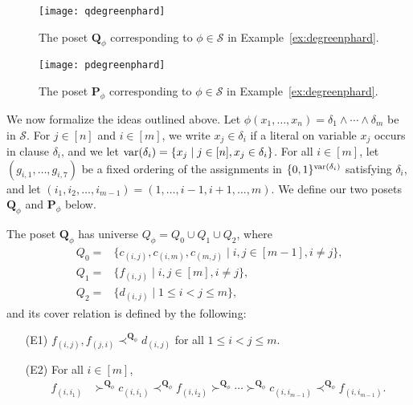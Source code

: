 \documentclass[usletter]{article}
\newcommand{\longversion}[1]{#1}
\newcommand{\shortversion}[1]{}
\newcommand{\longshort}[2]{\longversion{#1}\shortversion{#2}}
\newcommand{\pp}{\mathbf{P}}
\newcommand{\qq}{\mathbf{Q}}
\begin{document}
\newcommand{\figqdegreenphard}[0]{
\begin{figure}[h]
\centering
\texttt{[image: qdegreenphard]}
\caption{The poset $\qq_{\phi}$ corresponding to $\phi \in \mathcal{S}$ in Example~\ref{ex:degreenphard}.}
\label{fig:qdegreenphard}
\end{figure}}

\longversion{\figqdegreenphard}

\newcommand{\figpdegreenphard}[0]{
\begin{figure}[h]
\centering
\texttt{[image: pdegreenphard]}
\caption{The poset $\pp_{\phi}$ corresponding to $\phi \in \mathcal{S}$ in Example~\ref{ex:degreenphard}.}
\label{fig:pdegreenphard}
\end{figure}}

\longversion{\figpdegreenphard}

We now formalize the ideas outlined above. Let $\phi(x_1,\ldots,x_n)=\delta_1 \wedge \cdots \wedge \delta_m$ be in $\mathcal{S}$.  
For $j \in [n]$ and $i \in [m]$, we write $x_j \in \delta_i$ if a literal on variable $x_j$ occurs in clause $\delta_i$, 
and we let $\textup{var}(\delta_i)=\{ x_j \mid j \in [n], x_j \in \delta_i \}$.  
For all $i \in [m]$, let $(g_{i,1},\ldots,g_{i,7})$ be a fixed ordering of the assignments in $\{0,1\}^{\textup{var}(\delta_i)}$ satisfying $\delta_i$, 
and let $(i_1,i_2,\ldots,i_{m-1})=(1,\ldots,i-1,i+1,\ldots,m)$. We define our two posets $\qq_\phi$ and $\pp_\phi$ below.  

The poset $\qq_\phi$ has universe $Q_\phi=Q_{0} \cup Q_{1} \cup Q_{2}$, where 
\begin{align*}
Q_{0} = & \{ c_{(i,j)}, c_{(i,m)}, c_{(m,j)} \mid i, j \in [m-1], i\neq j \}\text{,} \\
Q_{1} = & \{ f_{(i,j)} \mid i,j \in [m], i\neq j \} \text{,}\\
Q_{2} = & \{ d_{(i,j)} \mid 1 \leq i<j \leq m \} \text{,}
\end{align*}
and its cover relation is defined by the following:
\begin{itemize}
\item[(E1)] $f_{(i,j)},f_{(j,i)} \prec^{\qq_\phi} d_{(i,j)}$ for all $1 \leq i<j \leq m$.  
\item[(E2)] For all $i \in [m]$, 
\longshort{\begin{align*}
f_{(i,i_1)} & \succ^{\qq_\phi} c_{(i,i_1)} \prec^{\qq_\phi} f_{(i,i_2)} \succ^{\qq_\phi} \cdots \succ^{\qq_\phi} c_{(i,i_{m-1})} \prec^{\qq_\phi} f_{(i,i_{m-1})}\text{.}
\end{align*}}{\begin{align*}
f_{(i,i_1)} & \succ^{\qq_\phi} c_{(i,i_1)} \prec^{\qq_\phi} f_{(i,i_2)} \succ^{\qq_\phi} \cdots \\
\cdots & \succ^{\qq_\phi} c_{(i,i_{m-1})} \prec^{\qq_\phi} f_{(i,i_{m-1})}\text{.}
\end{align*}}
\end{itemize}
\end{document}
